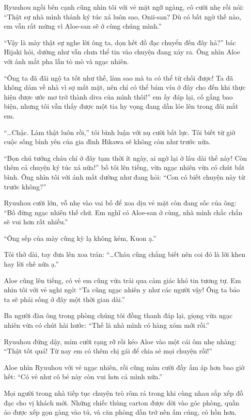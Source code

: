 \documentclass[../main.tex]{subfiles}
\begin{document}
Ryuuhou ngồi bên cạnh cũng nhìn tôi với vẻ mặt ngỡ ngàng, cô cười nhẹ rồi nói: ``Thật sự nhà mình thành ký túc xá luôn sao, Onii-san? Dù có bất ngờ thế nào, em vẫn rất mừng vì Aloe-san sẽ ở cùng chúng mình.''

``Vậy là mày thật sự nghe lời ông ta, dọn hết đồ đạc chuyển đến đây hả?'' bác Hijaki hỏi, dường như vẫn chưa thể tin vào chuyện đang xảy ra. Ông nhìn Aloe với ánh mắt pha lẫn tò mò và ngạc nhiên.

``Ông ta đã đãi ngộ ta tốt như thế, làm sao mà ta có thể từ chối được! Ta đã không dám về nhà vì sợ mất mặt, nên chỉ có thể bám víu ở đây cho đến khi thực hiện được ước mơ trở thành diva của mình thôi!'' em ấy đáp lại, cố gắng bao biện, nhưng tôi vẫn thấy được một tia hy vọng đang dần lóe lên trong đôi mắt em.

``\dots Chậc. Làm thật luôn rồi,'' tôi bình luận với nụ cười bất lực. Tôi biết từ giờ cuộc sống bình yên của gia đình Hikawa sẽ không còn như trước nữa.

``Bọn chú tưởng cháu chỉ ở đây tạm thời ít ngày, ai ngờ lại ở lâu dài thế này! Còn thêm cả chuyện ký túc xá nữa!'' bố tôi lên tiếng, vừa ngạc nhiên vừa có chút bất bình. Ông nhìn tôi với ánh mắt dường như đang hỏi: ``Con có biết chuyện này từ trước không?''

Ryuuhou cười lớn, vỗ nhẹ vào vai bố để xoa dịu vẻ mặt còn đang sốc của ông: ``Bố đừng ngạc nhiên thế chứ. Em nghĩ có Aloe-san ở cùng, nhà mình chắc chắn sẽ vui hơn rất nhiều.''

``Ông sếp của mày cũng kỳ lạ không kém, Kuon ạ.''

Tôi thở dài, tay đưa lên xoa trán: ``\dots Cháu cũng chẳng biết nên coi đó là lời khen hay lời chê nữa ạ.''

Aloe cũng lên tiếng, có vẻ em cũng vừa trải qua cảm giác khó tin tương tự. Em nhìn tôi với vẻ nghi ngờ: ``Ta cũng ngạc nhiên y như các người vậy! Ông ta bảo ta sẽ phải sống ở đây một thời gian dài.''

Ba người đàn ông trong phòng chúng tôi đồng thanh đáp lại, giọng vừa ngạc nhiên vừa có chút hài hước: ``Thế là nhà mình có hàng xóm mới rồi.''

Ryuuhou đứng dậy, mỉm cười rạng rỡ rồi kéo Aloe vào một cái ôm nhẹ nhàng: ``Thật tốt quá! Từ nay em có thêm chị gái để chia sẻ mọi chuyện rồi!''

Aloe nhìn Ryuuhou với vẻ ngạc nhiên, rồi cũng mỉm cười đầy ấm áp hơn bao giờ hết: ``Có vẻ như cô bé này còn vui hơn cả mình nữa.''

Mọi người trong nhà tiếp tục chuyện trò rôm rả trong khi cùng nhau sắp xếp đồ đạc cho vị khách mới. Những chiếc thùng carton được dời vào góc phòng, quần áo được xếp gọn gàng vào tủ, và căn phòng dần trở nên ấm cúng, có hồn hơn.
\end{document}
